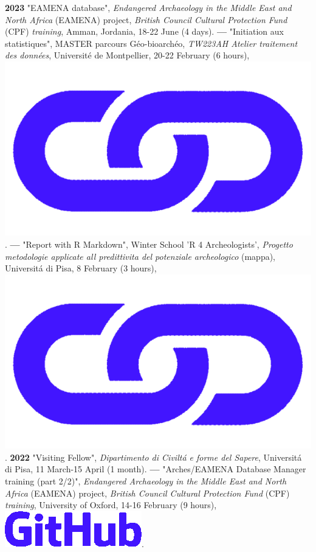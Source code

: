 \documentclass{article}
\begin{document}
\textbf{2023 }"EAMENA database", \textit{Endangered Archaeology in the Middle East and North Africa} (EAMENA) project, \textit{British Council Cultural Protection Fund} (CPF) \textit{training}, Amman, Jordania, 18-22 June (4 days).
\smallbreak
\textbf{--- }"Initiation aux statistiques", MASTER parcours Géo-bioarchéo, \textit{TW223AH Atelier traitement des données}, Universit\'{e} de Montpellier, 20-22 February (6 hours), \href{http://shinyserver.cfs.unipi.it:3838/teach/stats/upv/_site/#/title-slide}{\includegraphics[scale=0.02]{link_darkblue.png}}.
\smallbreak
\textbf{--- }"Report with R Markdown", Winter School 'R 4 Archeologists', \textit{Progetto metodologie applicate all predittivita del potenziale archeologico} (mappa), Universit\'{a} di Pisa, 8 February (3 hours), \href{https://zoometh.github.io/thomashuet/teach/stats/r4a}{\includegraphics[scale=0.02]{link_darkblue.png}}.
\smallbreak
\textbf{2022 }"Visiting Fellow", \textit{Dipartimento di Civilt\'{a} e forme del Sapere}, Universit\'{a} di Pisa, 11 March-15 April (1 month).
\smallbreak
\textbf{--- }"Arches/EAMENA Database Manager training (part 2/2)", \textit{Endangered Archaeology in the Middle East and North Africa} (EAMENA) project, \textit{British Council Cultural Protection Fund} (CPF) \textit{training}, University of Oxford, 14-16 February (9 hours), \href{https://github.com/eamena-oxford/eamena-arches-dev/tree/main/training#readme}{\includegraphics[scale=0.12]{github-rect.png}}.
\end{document}
